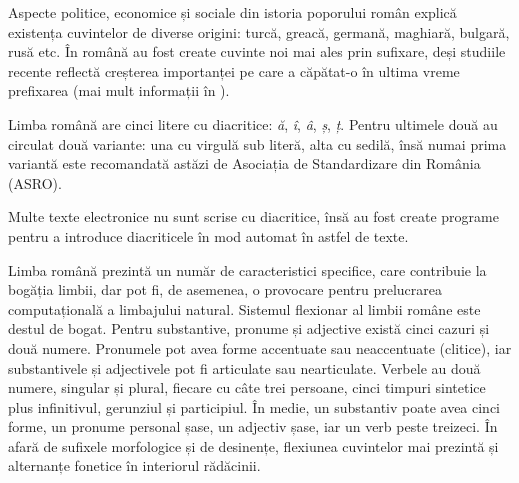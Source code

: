 \begin{multicols}{2}
Aspecte politice, economice și sociale din istoria poporului român explică existența cuvintelor de diverse origini: turcă, greacă, germană, maghiară, bulgară, rusă etc. În română au fost create cuvinte noi mai ales prin sufixare, deși studiile recente reflectă creșterea importanței pe care a căpătat-o în ultima vreme prefixarea (mai mult informații în \cite{brancus}).


Limba română are cinci litere cu diacritice: \textit{ă}, \textit{î}, \textit{â}, \textit{ș}, \textit{ț}. Pentru ultimele două au circulat două variante: una cu virgulă sub literă, alta cu sedilă, însă numai prima variantă este recomandată astăzi de Asociația de Standardizare din România (ASRO). 

Multe texte electronice nu sunt scrise cu diacritice, însă au fost create programe pentru a introduce diacriticele în mod automat în astfel de texte.


Limba română prezintă un număr de caracteristici specifice, care contribuie la bogăția limbii, dar pot fi, de asemenea, o provocare pentru prelucrarea computațională a limbajului natural. Sistemul flexionar al limbii române este destul de bogat. Pentru substantive, pronume și adjective există cinci cazuri și două numere. Pronumele pot avea forme accentuate sau neaccentuate (clitice), iar substantivele și adjectivele pot fi articulate sau nearticulate. Verbele au două numere, singular și plural, fiecare cu câte trei persoane, cinci timpuri sintetice plus infinitivul, gerunziul și participiul. În medie, un substantiv poate avea cinci forme, un pronume personal șase, un adjectiv șase, iar un verb peste treizeci. În afară de sufixele morfologice și de desinențe, flexiunea cuvintelor mai prezintă și alternanțe fonetice în interiorul rădăcinii.



\end{multicols}
